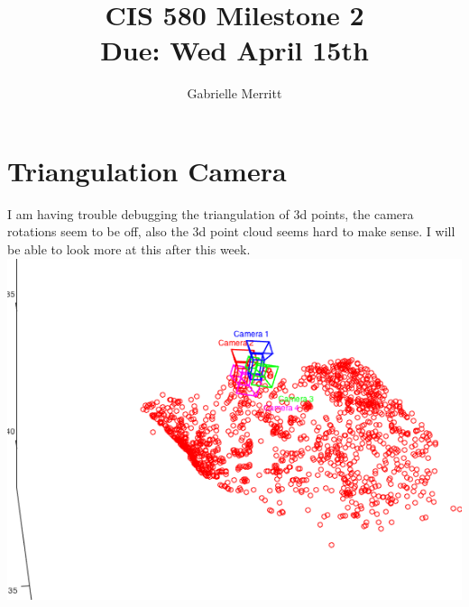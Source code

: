 \documentclass[11pt,english]{article}
\title{CIS 580 Milestone 2\\
Due:  Wed April 15th}
\author{Gabrielle Merritt}
\date{}
\begin{document}
\maketitle
\section*{Triangulation Camera}
I am having trouble debugging the triangulation of 3d points, the camera rotations seem to be off, also the 3d point cloud seems hard to make sense. 
I will be able to look  more at this after this week. 
\includegraphics[width = \linewidth]{issues_with_triangulation2}
\end{document}
